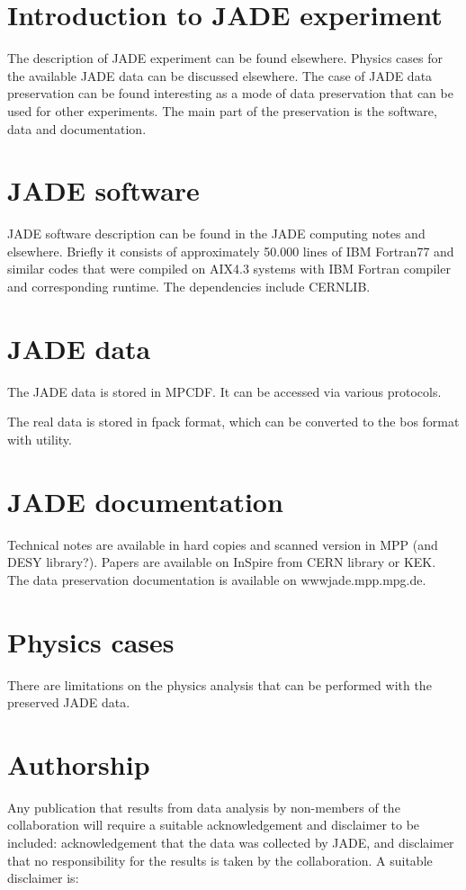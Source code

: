 \section{Introduction to JADE experiment}
The description of JADE experiment can be found elsewhere.\cite{Bartel:1986ua}
Physics cases for the available JADE data can be discussed elsewhere\cite{Bartel:1986ua}.
The case of JADE data preservation can be found interesting as a mode of data preservation that can be used for other experiments.
The main part of the preservation is the  software, data and documentation.
\section{JADE software}
JADE software description can be found in the JADE computing notes and elsewhere.
Briefly it consists of approximately 50.000 lines of IBM Fortran77 and similar codes 
that were compiled on AIX4.3 systems with IBM Fortran compiler and corresponding runtime.
The dependencies include CERNLIB.


\section{JADE data}
The JADE data is stored in MPCDF.
It can be accessed via various protocols.

The real data is stored in fpack format, which can be converted to the bos format with utility.

\section{JADE documentation}
Technical notes are available in hard copies and scanned version in MPP (and DESY library?).
Papers are available on InSpire from CERN library or KEK.
The data preservation documentation is available on wwwjade.mpp.mpg.de.

\section{Physics cases}
There are limitations on the physics analysis that can be performed with the preserved JADE data.

\section{Authorship}
Any
publication that results from data analysis by non-members of the collaboration will require a
suitable acknowledgement and disclaimer to be included: acknowledgement that the data was
collected by JADE, and disclaimer that no responsibility for the results is taken by the
collaboration. A suitable disclaimer is:

